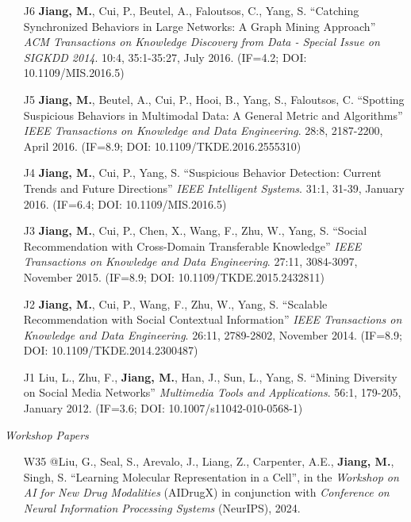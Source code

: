 \documentclass[10pt]{article}
\newenvironment{myindentpar}[1]%
{\begin{list}{}%
         {\setlength{\leftmargin}{#1}}%
         \item[]%
}
{\end{list}}
\newcounter{list}
\begin{document}
\begin{myindentpar}{0.00cm}
\begin{enumerate}[leftmargin=.5cm]
\item[J6] \textbf{Jiang, M.}, Cui, P., Beutel, A., Faloutsos, C., Yang, S. ``Catching Synchronized Behaviors in Large Networks: A Graph Mining Approach'' \textit{ACM Transactions on Knowledge Discovery from Data - Special Issue on SIGKDD 2014}. 10:4, 35:1-35:27, July 2016. (IF=4.2; DOI: 10.1109/MIS.2016.5)

\item[J5] \textbf{Jiang, M.}, Beutel, A., Cui, P., Hooi, B., Yang, S., Faloutsos, C. ``Spotting Suspicious Behaviors in Multimodal Data: A General Metric and Algorithms'' \textit{IEEE Transactions on Knowledge and Data Engineering}. 28:8, 2187-2200, April 2016. (IF=8.9; DOI: 10.1109/TKDE.2016.2555310)

\item[J4] \textbf{Jiang, M.}, Cui, P., Yang, S. ``Suspicious Behavior Detection: Current Trends and Future Directions'' \textit{IEEE Intelligent Systems}. 31:1, 31-39, January 2016. (IF=6.4; DOI: 10.1109/MIS.2016.5)

\item[J3] \textbf{Jiang, M.}, Cui, P., Chen, X., Wang, F., Zhu, W., Yang, S. ``Social Recommendation with Cross-Domain Transferable Knowledge'' \textit{IEEE Transactions on Knowledge and Data Engineering}. 27:11, 3084-3097, November 2015. (IF=8.9; DOI: 10.1109/TKDE.2015.2432811)

\item[J2] \textbf{Jiang, M.}, Cui, P., Wang, F., Zhu, W., Yang, S. ``Scalable Recommendation with Social Contextual Information'' \textit{IEEE Transactions on Knowledge and Data Engineering}. 26:11, 2789-2802, November 2014. (IF=8.9; DOI: 10.1109/TKDE.2014.2300487)

\item[J1] Liu, L., Zhu, F., \textbf{Jiang, M.}, Han, J., Sun, L., Yang, S. ``Mining Diversity on Social Media Networks'' \textit{Multimedia Tools and Applications}. 56:1, 179-205, January 2012. (IF=3.6; DOI: 10.1007/s11042-010-0568-1)

\end{enumerate}

\hspace{-0.25cm}\textit{Workshop Papers}

\begin{enumerate}[leftmargin=.5cm]

\item[W35] @Liu, G., Seal, S., Arevalo, J., Liang, Z., Carpenter, A.E., \textbf{Jiang, M.}, Singh, S. ``Learning Molecular Representation in a Cell'', in the \textit{Workshop on AI for New Drug Modalities} (AIDrugX) in conjunction with \textit{Conference on Neural Information Processing Systems} (NeurIPS), 2024. 
		

\end{enumerate}
\end{myindentpar}
\end{document}
